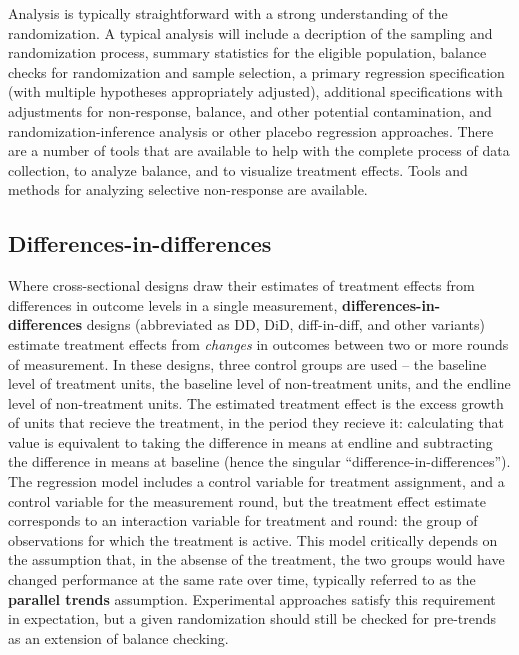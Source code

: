 Analysis is typically straightforward with a strong understanding of the randomization.
A typical analysis will include a decription of the sampling and randomization process,
summary statistics for the eligible population,
balance checks for randomization and sample selection,
a primary regression specification (with multiple hypotheses appropriately adjusted),
additional specifications with adjustments for non-response, balance, and other potential contamination,
and randomization-inference analysis or other placebo regression approaches.
There are a number of tools that are available
to help with the complete process of data collection,
to analyze balance,
and to visualize treatment effects.
Tools and methods for analyzing selective non-response are available.

\subsection{Differences-in-differences}

Where cross-sectional designs draw their estimates of treatment effects
from differences in outcome levels in a single measurement,
\textbf{differences-in-differences}
designs (abbreviated as DD, DiD, diff-in-diff, and other variants)
estimate treatment effects from \textit{changes} in outcomes
between two or more rounds of measurement.
In these designs, three control groups are used –
the baseline level of treatment units,
the baseline level of non-treatment units,
and the endline level of non-treatment units.
The estimated treatment effect is the excess growth
of units that recieve the treatment, in the period they recieve it:
calculating that value is equivalent to taking
the difference in means at endline and subtracting
the difference in means at baseline
(hence the singular ``difference-in-differences'').\cite{mckenzie2012beyond}
The regression model includes a control variable for treatment assignment,
and a control variable for the measurement round,
but the treatment effect estimate corresponds to
an interaction variable for treatment and round:
the group of observations for which the treatment is active.
This model critically depends on the assumption that,
in the absense of the treatment,
the two groups would have changed performance at the same rate over time,
typically referred to as the \textbf{parallel trends} assumption.
Experimental approaches satisfy this requirement in expectation,
but a given randomization should still be checked for pre-trends
as an extension of balance checking.


